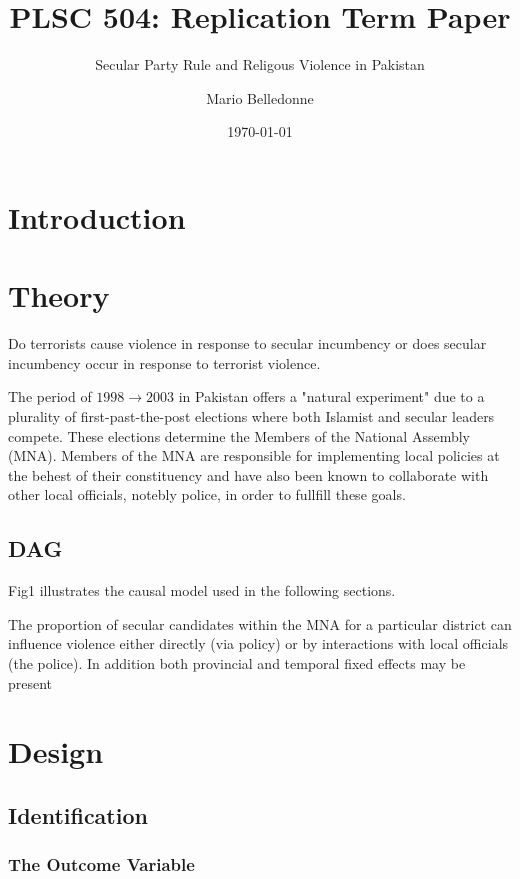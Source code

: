 \documentclass{scrartcl}
\title{PLSC 504: Replication Term Paper}
\subtitle{Secular Party Rule and Religous Violence in Pakistan}
\author{Mario Belledonne}
\date{\today}
\begin{document}
\maketitle

\section{Introduction}


\section{Theory}

Do terrorists cause violence in response to secular incumbency or does secular incumbency occur in response to terrorist violence. 

The period of $1998 \rightarrow 2003$ in Pakistan offers a "natural experiment" due to a plurality of first-past-the-post elections where both Islamist and secular leaders compete. 
These elections determine the Members of the National Assembly (MNA). Members of the MNA are responsible for implementing local policies at the behest of their constituency and have also been known to collaborate with other local officials, notebly police, in order to fullfill these goals. 

\subsection{DAG}


Fig1 illustrates the causal model used in the following sections. 

The proportion of secular candidates within the MNA for a particular district can influence violence either directly (via policy) or by interactions with local officials (the police). 
In addition both provincial and temporal fixed effects may be present
\section{Design}

\subsection{Identification}

\subsubsection{The Outcome Variable}
\end{document}
